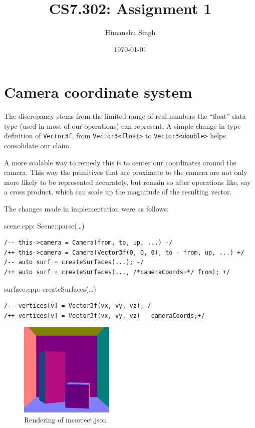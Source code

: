 \documentclass[a4paper]{article}
\title{CS7.302: Assignment 1}
\author{Himanshu Singh}
\date{\today}
\begin{document}
\maketitle

\section{Camera coordinate system}

The discrepancy stems from the limited range of real numbers the ``float'' data type (used in most of our operations) can represent. A simple change in type definition of \texttt{Vector3f}, from \texttt{Vector3<float>} to \texttt{Vector3<double>} helps consolidate our claim.

A more scalable way to remedy this is to center our coordinates around the camera. This way the primitives that are proximate to the camera are not only more likely to be represented accurately, but remain so after operations like, say a cross product, which can scale up the magnitude of the resulting vector.

The changes made in implementation were as follows:

\begin{boxx}{scene.cpp: Scene::parse(\ldots)}
\begin{lstlisting}
/-- this->camera = Camera(from, to, up, ...) -/
/++ this->camera = Camera(Vector3f(0, 0, 0), to - from, up, ...) +/
/-- auto surf = createSurfaces(...); -/
/++ auto surf = createSurfaces(..., /*cameraCoords=*/ from); +/
\end{lstlisting}
\end{boxx}

\begin{boxx}{surface.cpp: createSurfaces(\ldots)}
\begin{lstlisting}
/-- vertices[v] = Vector3f(vx, vy, vz);-/
/++ vertices[v] = Vector3f(vx, vy, vz) - cameraCoords;+/
\end{lstlisting}
\end{boxx}

\begin{figure}[ht]
  \centering
  \includegraphics[width=0.4\textwidth]{q1/incorrect.png}
  \caption{Rendering of incorrect.json}
\end{figure}
\end{document}
